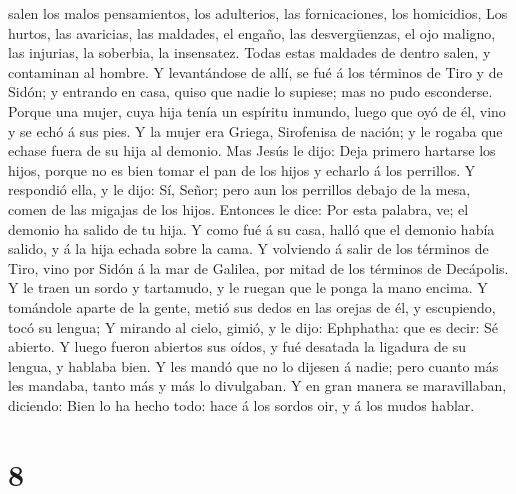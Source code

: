 salen los malos pensamientos, los adulterios, las fornicaciones, los
homicidios,  Los hurtos, las avaricias, las maldades, el
engaño, las desvergüenzas, el ojo maligno, las injurias, la soberbia, la
insensatez.  Todas estas maldades de dentro salen, y
contaminan al hombre.  Y levantándose de allí, se fué á
los términos de Tiro y de Sidón; y entrando en casa, quiso que nadie lo
supiese; mas no pudo esconderse.  Porque una mujer, cuya
hija tenía un espíritu inmundo, luego que oyó de él, vino y se echó á
sus pies.  Y la mujer era Griega, Sirofenisa de nación; y
le rogaba que echase fuera de su hija al demonio.  Mas
Jesús le dijo: Deja primero hartarse los hijos, porque no es bien tomar
el pan de los hijos y echarlo á los perrillos.  Y
respondió ella, y le dijo: Sí, Señor; pero aun los perrillos debajo de
la mesa, comen de las migajas de los hijos.  Entonces le
dice: Por esta palabra, ve; el demonio ha salido de tu hija.
 Y como fué á su casa, halló que el demonio había salido,
y á la hija echada sobre la cama.  Y volviendo á salir de
los términos de Tiro, vino por Sidón á la mar de Galilea, por mitad de
los términos de Decápolis.  Y le traen un sordo y
tartamudo, y le ruegan que le ponga la mano encima.  Y
tomándole aparte de la gente, metió sus dedos en las orejas de él, y
escupiendo, tocó su lengua;  Y mirando al cielo, gimió, y
le dijo: Ephphatha: que es decir: Sé abierto.  Y luego
fueron abiertos sus oídos, y fué desatada la ligadura de su lengua, y
hablaba bien.  Y les mandó que no lo dijesen á nadie;
pero cuanto más les mandaba, tanto más y más lo divulgaban.
 Y en gran manera se maravillaban, diciendo: Bien lo ha
hecho todo: hace á los sordos oir, y á los mudos hablar.

\hypertarget{section-7}{%
\section{8}\label{section-7}}

